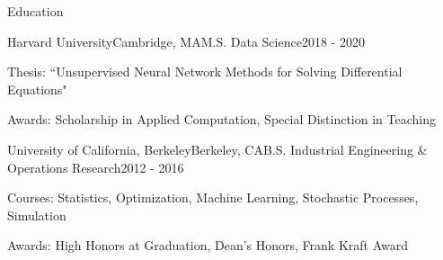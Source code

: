 \documentclass{resume} %
\begin{document}
\begin{rSection}{Education}

\begin{rSubsection}{Harvard University}{Cambridge, MA}{M.S. Data Science}{2018 - 2020}
	\item Thesis: ``Unsupervised Neural Network Methods for Solving Differential Equations"
	\item Awards: Scholarship in Applied Computation, Special Distinction in Teaching
\end{rSubsection}
\begin{rSubsection}{University of California, Berkeley}{Berkeley, CA}{B.S. Industrial Engineering \& Operations Research}{2012 - 2016}
	\item Courses: Statistics, Optimization, Machine Learning, Stochastic Processes, Simulation
	\item Awards: High Honors at Graduation, Dean's Honors, Frank Kraft Award
\end{rSubsection}

\end{rSection}
\end{document}
